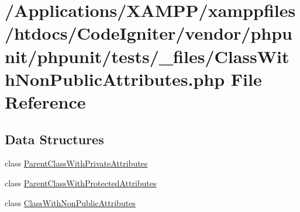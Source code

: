 \hypertarget{_class_with_non_public_attributes_8php}{}\section{/\+Applications/\+X\+A\+M\+P\+P/xamppfiles/htdocs/\+Code\+Igniter/vendor/phpunit/phpunit/tests/\+\_\+files/\+Class\+With\+Non\+Public\+Attributes.php File Reference}
\label{_class_with_non_public_attributes_8php}
\subsection*{Data Structures}
\begin{DoxyCompactItemize}
\item 
class \mbox{\hyperlink{class_parent_class_with_private_attributes}{Parent\+Class\+With\+Private\+Attributes}}
\item 
class \mbox{\hyperlink{class_parent_class_with_protected_attributes}{Parent\+Class\+With\+Protected\+Attributes}}
\item 
class \mbox{\hyperlink{class_class_with_non_public_attributes}{Class\+With\+Non\+Public\+Attributes}}
\end{DoxyCompactItemize}
